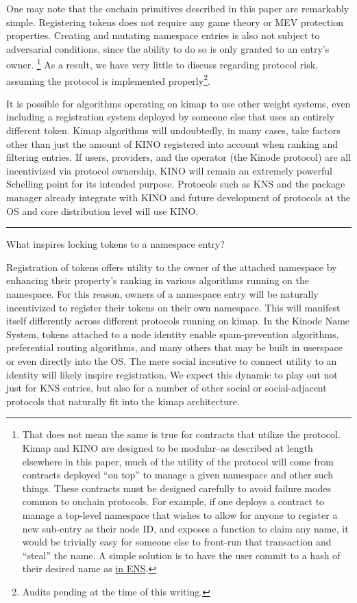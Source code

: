 \documentclass[runningheads]{llncs}
\begin{document}
One may note that the onchain primitives described in this paper are remarkably simple.
Registering tokens does not require any game theory or MEV protection properties.
Creating and mutating namespace entries is also not subject to adversarial conditions, since the ability to do so is only granted to an entry's owner.
\footnote{That does not mean the same is true for contracts that utilize the protocol.
Kimap and KINO are designed to be modular–as described at length elsewhere in this paper, much of the utility of the protocol will come from contracts deployed ``on top'' to manage a given namespace and other such things.
These contracts must be designed carefully to avoid failure modes common to onchain protocols.
For example, if one deploys a contract to manage a top-level namespace that wishes to allow for anyone to register a new sub-entry as their node ID, and exposes a function to claim any name, it would be trivially easy for someone else to front-run that transaction and ``steal'' the name.
A simple solution is to have the user commit to a hash of their desired name as \href{https://docs.ens.domains/registry/eth\#commit-reveal}{in ENS}.}
As a result, we have very little to discuss regarding protocol risk, assuming the protocol is implemented properly\footnote{Audits pending at the time of this writing.}.

It is possible for algorithms operating on kimap to use other weight systems, even including a registration system deployed by someone else that uses an entirely different token.
Kimap algorithms will undoubtedly, in many cases, take factors other than just the amount of KINO registered into account when ranking and filtering entries.
If users, providers, and the operator (the Kinode protocol) are all incentivized via protocol ownership, KINO will remain an extremely powerful Schelling point for its intended purpose.
Protocols such as KNS and the package manager already integrate with KINO and future development of protocols at the OS and core distribution level will use KINO.

\begin{center}
\noindent\rule{8cm}{0.4pt}
\end{center}

What inspires locking tokens to a namespace entry?

Registration of tokens offers utility to the owner of the attached namespace by enhancing their property's ranking in various algorithms running on the namespace.
For this reason, owners of a namespace entry will be naturally incentivized to register their tokens on their own namespace.
This will manifest itself differently across different protocols running on kimap.
In the Kinode Name System, tokens attached to a node identity enable spam-prevention algorithms, preferential routing algorithms, and many others that may be built in userspace or even directly into the OS.
The mere social incentive to connect utility to an identity will likely inspire registration.
We expect this dynamic to play out not just for KNS entries, but also for a number of other social or social-adjacent protocols that naturally fit into the kimap architecture.
\end{document}
